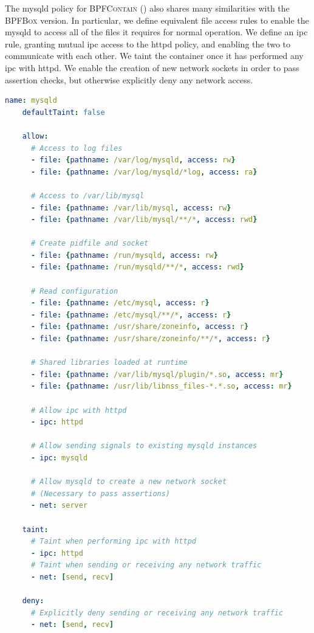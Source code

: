\documentclass[
  fontsize=12pt,
  titlepage=firstiscover,
  paper=letter,
oneside,
  cleardoublepage=plain,
  parskip=half-,
  DIV=10,
  parindent,
  appendixprefix,
  chapterprefix,
  listof=totoc,
]{scrbook}
\newcommand{\bpfbox}{\textsc{BPFBox}}
\newcommand{\bpfcontain}{\textsc{BPFContain}}
\begin{document}
The mysqld policy for \bpfcontain{} () also shares many
similarities with the \bpfbox{} version.  In particular, we define equivalent file access
rules to enable the mysqld to access all of the files it requires for normal operation. We
define an \gls{ipc} rule, granting mutual \gls{ipc} access to the httpd policy, and
enabling the two to communicate with each other. We taint the container once it has
performed any \gls{ipc} with httpd. We enable the creation of new network sockets
in order to pass assertion checks, but otherwise explicitly deny any network access.

\begin{lstlisting}[language=yaml, gobble=4, float=false, caption={[A \bpfcontain{} policy for MySQL]
  A \bpfcontain{} policy for MySQL.
}, label={lst:bpfcontain-mysql}]
    name: mysqld
    defaultTaint: false

    allow:
      # Access to log files
      - file: {pathname: /var/log/mysqld, access: rw}
      - file: {pathname: /var/log/mysqld/*log, access: ra}

      # Access to /var/lib/mysql
      - file: {pathname: /var/lib/mysql, access: rw}
      - file: {pathname: /var/lib/mysql/**/*, access: rwd}

      # Create pidfile and socket
      - file: {pathname: /run/mysqld, access: rw}
      - file: {pathname: /run/mysqld/**/*, access: rwd}

      # Read configuration
      - file: {pathname: /etc/mysql, access: r}
      - file: {pathname: /etc/mysql/**/*, access: r}
      - file: {pathname: /usr/share/zoneinfo, access: r}
      - file: {pathname: /usr/share/zoneinfo/**/*, access: r}

      # Shared libraries loaded at runtime
      - file: {pathname: /var/lib/mysql/plugin/*.so, access: mr}
      - file: {pathname: /usr/lib/libnss_files-*.*.so, access: mr}

      # Allow ipc with httpd
      - ipc: httpd

      # Allow sending signals to existing mysqld instances
      - ipc: mysqld

      # Allow mysqld to create a new network socket
      # (Necessary to pass assertions)
      - net: server

    taint:
      # Taint when performing ipc with httpd
      - ipc: httpd
      # Taint when sending or receiving any network traffic
      - net: [send, recv]

    deny:
      # Explicitly deny sending or receiving any network traffic
      - net: [send, recv]
\end{lstlisting}
\end{document}
